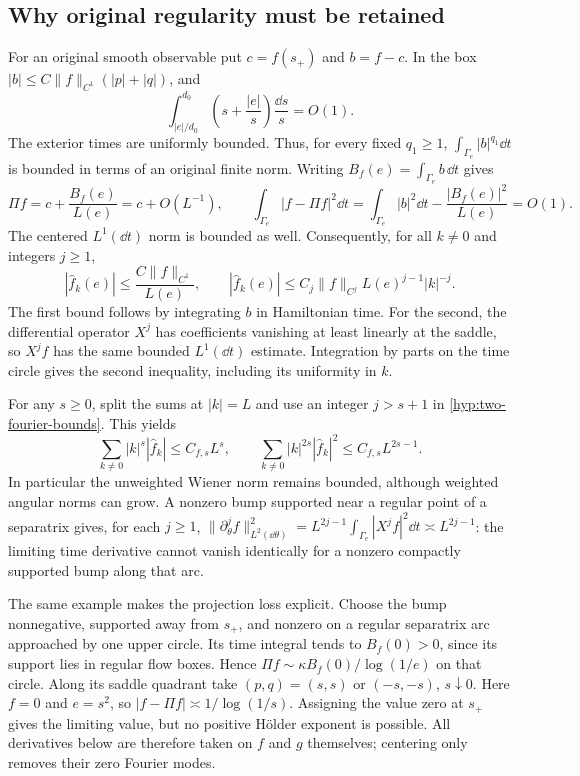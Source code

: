\subsection{Why original regularity must be retained}

For an original smooth observable put $c=f(s_+)$ and $b=f-c$.
In the box $|b|\le C\|f\|_{C^1}(|p|+|q|)$, and
\[
 \int_{|e|/d_0}^{d_0}
       \left(s+\frac{|e|}{s}\right)\frac{\dd s}{s}=O(1).
\]
The exterior times are uniformly bounded.  Thus, for every fixed
$q_1\ge1$, $\int_{\Gamma_e}|b|^{q_1}\dd t$ is bounded in terms of
an original finite norm.  Writing $B_f(e)=\int_{\Gamma_e}b\,\dd t$ gives
\begin{equation}\label{hyp:mean}
 \Pi f=c+\frac{B_f(e)}{L(e)}=c+O(L^{-1}),\qquad
 \int_{\Gamma_e}|f-\Pi f|^2\dd t
  =\int_{\Gamma_e}|b|^2\dd t-\frac{|B_f(e)|^2}{L(e)}=O(1).
\end{equation}
The centered $L^1(\dd t)$ norm is bounded as well.
Consequently, for all $k\ne0$ and integers $j\ge1$,
\begin{equation}\label{hyp:two-fourier-bounds}
 |\widehat f_k(e)|\le\frac{C\|f\|_{C^1}}{L(e)},\qquad
 |\widehat f_k(e)|\le
 C_j\|f\|_{C^j}L(e)^{j-1}|k|^{-j}.
\end{equation}
The first bound follows by integrating $b$ in Hamiltonian time.  For
the second, the differential operator $X^j$ has coefficients vanishing
at least linearly at the saddle, so $X^jf$ has the same bounded
$L^1(\dd t)$ estimate.  Integration by parts on the time circle gives
the second inequality, including its uniformity in $k$.

For any $s\ge0$, split the sums at $|k|=L$ and use an integer
$j>s+1$ in \eqref{hyp:two-fourier-bounds}.  This yields
\[
 \sum_{k\ne0}|k|^s|\widehat f_k|\le C_{f,s}L^s,
 \qquad
 \sum_{k\ne0}|k|^{2s}|\widehat f_k|^2\le C_{f,s}L^{2s-1}.
\]
In particular the unweighted Wiener norm remains bounded, although
weighted angular norms can grow.  A nonzero bump supported near a
regular point of a separatrix gives, for each $j\ge1$,
$\|\partial_\theta^j f\|_{L^2(\dd\theta)}^2
 =L^{2j-1}\int_{\Gamma_e}|X^jf|^2\dd t\asymp L^{2j-1}$:
the limiting time derivative cannot vanish identically for a nonzero
compactly supported bump along that arc.

The same example makes the projection loss explicit.  Choose the bump
nonnegative, supported away from $s_+$, and nonzero on a regular
separatrix arc approached by one upper circle.  Its time integral tends
to $B_f(0)>0$, since its support lies in regular flow boxes.  Hence
$\Pi f\sim\kappa B_f(0)/\log(1/e)$ on that circle.
Along its saddle quadrant take $(p,q)=(s,s)$ or $(-s,-s)$, $s\downarrow0$.
Here $f=0$ and $e=s^2$, so $|f-\Pi f|\asymp1/\log(1/s)$.
Assigning the value zero at $s_+$ gives the limiting value, but no
positive H\"older exponent is possible.  All derivatives below are
therefore taken on $f$ and $g$ themselves; centering only removes their
zero Fourier modes.

